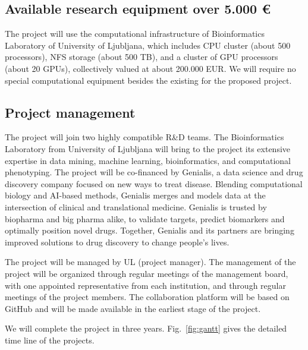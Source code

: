 \documentclass[11pt,a4paper]{article}
\begin{document}
\subsection{Available research equipment over 5.000 €}

The project will use the computational infrastructure of Bioinformatics Laboratory of University of Ljubljana, which includes CPU cluster (about 500 processors), NFS storage (about 500 TB), and a cluster of GPU processors (about 20 GPUs), collectively valued at about 200.000 EUR. We will require no special computational equipment besides the existing for the proposed project.

\subsection{Project management}

The project will join two highly compatible R\&D teams. The Bioinformatics Laboratory from University of Ljubljana will bring to the project its extensive expertise in data mining, machine learning, bioinformatics, and computational phenotyping. The project will be co-financed by Genialis, a data science and drug discovery company focused on new ways to treat disease. Blending computational biology and AI-based methods, Genialis merges and models data at the intersection of clinical and translational medicine. Genialis is trusted by biopharma and big pharma alike, to validate targets, predict biomarkers and optimally position novel drugs. Together, Genialis and its partners are bringing improved solutions to drug discovery to change people's lives.

The project will be managed by UL (project manager). The management of the project will be organized through regular meetings of the management board, with one appointed representative from each institution, and through regular meetings of the project members. The collaboration platform will be based on GitHub and will be made available in the earliest stage of the project.

We will complete the project in three years. Fig.~\ref{fig:gantt} gives the detailed time line of the projects.
\end{document}
